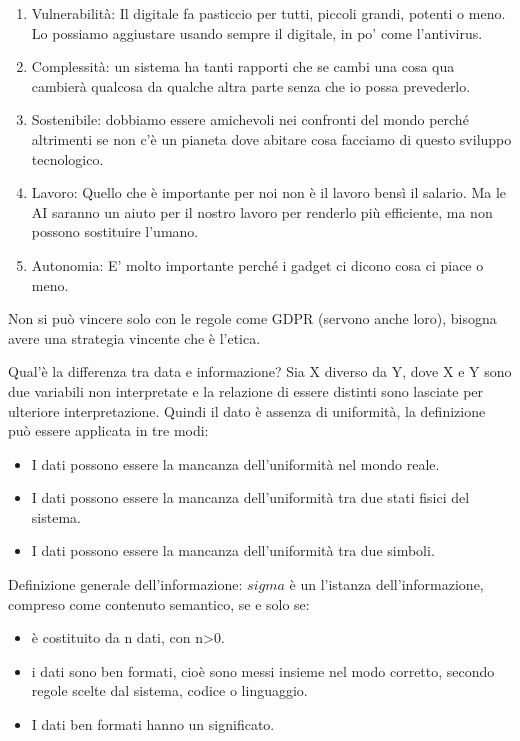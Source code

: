 \documentclass[a4page, 11pt]{article}
\begin{document}
\begin{enumerate}
	\def\labelenumi{\arabic{enumi})}
	 
	\item
	Vulnerabilità: Il digitale fa pasticcio per tutti, piccoli grandi,
	potenti o meno. Lo possiamo aggiustare usando sempre il digitale, in
	po' come l'antivirus.
	\item
	Complessità: un sistema ha tanti rapporti che se cambi una cosa qua
	cambierà qualcosa da qualche altra parte senza che io possa
	prevederlo. 
	\item
	Sostenibile: dobbiamo essere amichevoli nei confronti del mondo perché
	altrimenti se non c'è un pianeta dove abitare cosa facciamo di questo
	sviluppo tecnologico. 
	\item
	Lavoro: Quello che è importante per noi non è il lavoro bensì il
	salario. Ma le AI saranno un aiuto per il nostro lavoro per renderlo
	più efficiente, ma non possono sostituire l'umano.
	\item
	Autonomia: E' molto importante perché i gadget ci dicono cosa ci piace
	o meno.
\end{enumerate}

Non si può vincere solo con le regole come GDPR (servono anche loro),
bisogna avere una strategia vincente che è l'etica.

Qual'è la differenza tra data e informazione? Sia X diverso da Y, dove X
e Y sono due variabili non interpretate e la relazione di essere
distinti sono lasciate per ulteriore interpretazione. Quindi il dato è
assenza di uniformità, la definizione può essere applicata in tre modi:

\begin{itemize}
	 
	\item
	I dati possono essere la mancanza dell'uniformità nel mondo reale.
	\item
	I dati possono essere la mancanza dell'uniformità tra due stati fisici
	del sistema.
	\item
	I dati possono essere la mancanza dell'uniformità tra due simboli.
\end{itemize}

Definizione generale dell'informazione: $sigma$ è un l'istanza
dell'informazione, compreso come contenuto semantico, se e solo se:

\begin{itemize}
	 
	\item
	è costituito da n dati, con n\textgreater{}0.
	\item
	i dati sono ben formati, cioè sono messi insieme nel modo corretto,
	secondo regole scelte dal sistema, codice o linguaggio.
	\item
	I dati ben formati hanno un significato.
\end{itemize}
\end{document}
